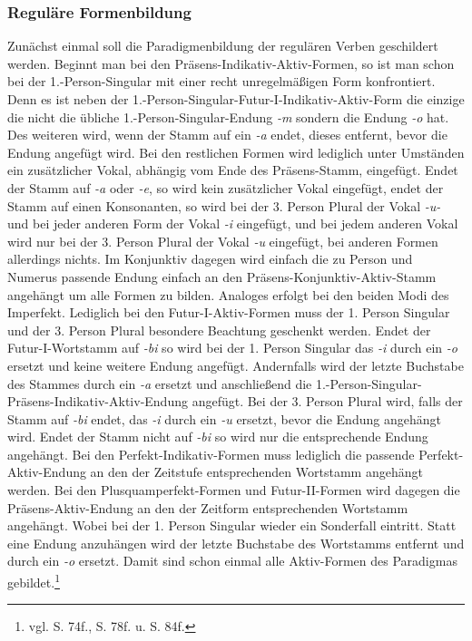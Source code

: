 \documentclass[fontsize=12pt,abstract=on,titlepage,bibliography=totoc,ngerman,listof=totoc]{scrreprt}
\begin{document}
\subsubsection{Reguläre Formenbildung}
Zunächst einmal soll die Paradigmenbildung der regulären Verben geschildert werden. Beginnt man bei den Präsens-Indikativ-Aktiv-Formen, so ist man schon bei der 1.-Person-Singular mit einer recht unregelmäßigen Form konfrontiert. Denn es ist neben der 1.-Person-Singular-Futur-I-Indikativ-Aktiv-Form die einzige die nicht die übliche 1.-Person-Singular-Endung \textit{-m} sondern die Endung \textit{-o} hat. Des weiteren wird, wenn der Stamm auf ein \textit{-a} endet, dieses entfernt, bevor die Endung angefügt wird. Bei den restlichen Formen wird lediglich unter Umständen ein zusätzlicher Vokal, abhängig vom Ende des Präsens-Stamm, eingefügt. Endet der Stamm auf \textit{-a} oder \textit{-e}, so wird kein zusätzlicher Vokal eingefügt, endet der Stamm auf einen Konsonanten, so wird bei der 3. Person Plural der Vokal \textit{-u-} und bei jeder anderen Form der Vokal \textit{-i} eingefügt, und bei jedem anderen Vokal wird nur bei der 3. Person Plural der Vokal \textit{-u} eingefügt, bei anderen Formen allerdings nichts. Im Konjunktiv dagegen wird einfach die zu Person und Numerus passende Endung einfach an den Präsens-Konjunktiv-Aktiv-Stamm angehängt um alle Formen zu bilden. Analoges erfolgt bei den beiden Modi des Imperfekt. Lediglich bei den Futur-I-Aktiv-Formen muss der 1. Person Singular und der 3. Person Plural besondere Beachtung geschenkt werden. Endet der Futur-I-Wortstamm auf \textit{-bi} so wird bei der 1. Person Singular das \textit{-i} durch ein \textit{-o} ersetzt und keine weitere Endung angefügt. Andernfalls wird der letzte Buchstabe des Stammes durch ein \textit{-a} ersetzt und anschließend die 1.-Person-Singular-Präsens-Indikativ-Aktiv-Endung angefügt. Bei der 3. Person Plural wird, falls der Stamm auf \textit{-bi} endet, das \textit{-i} durch ein \textit{-u} ersetzt, bevor die Endung angehängt wird. Endet der Stamm nicht auf \textit{-bi} so wird nur die entsprechende Endung angehängt. Bei den Perfekt-Indikativ-Formen muss lediglich die passende Perfekt-Aktiv-Endung an den der Zeitstufe entsprechenden Wortstamm angehängt werden. Bei den Plusquamperfekt-Formen und Futur-II-Formen wird dagegen die Präsens-Aktiv-Endung an den der Zeitform entsprechenden Wortstamm angehängt. Wobei bei der 1. Person Singular wieder ein Sonderfall eintritt. Statt eine Endung anzuhängen wird der letzte Buchstabe des Wortstamms entfernt und durch ein \textit{-o} ersetzt. Damit sind schon einmal alle Aktiv-Formen des Paradigmas gebildet.\footnote{vgl. \cite{BAYER-LINDAUER1994} S. 74f., S. 78f. u. S. 84f.} \par
\end{document}
